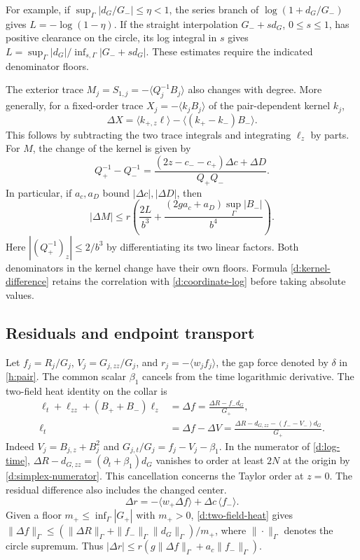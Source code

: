 For example, if \(\sup_\Gamma|d_G/G_-|\le\eta<1\), the series
branch of \(\log(1+d_G/G_-)\) gives \(L=-\log(1-\eta)\).
If the straight interpolation \(G_-+s d_G\), \(0\le s\le1\), has
positive clearance on the circle, its log integral in \(s\) gives
\(L=\sup_\Gamma |d_G|/\inf_{s,\Gamma}|G_-+s d_G|\).
These estimates require the indicated denominator floors.

The exterior trace \(M_j=S_{1,j}=-\langle Q_j^{-1}B_j\rangle\)
also changes with degree. More generally, for a fixed-order trace
\(X_j=-\langle k_j B_j\rangle\) of the pair-dependent kernel \(k_j\),
\begin{equation}
 \Delta X=\langle k_{+,z}\ell\rangle
           -\langle(k_+-k_-)B_-\rangle .
 \label{d:kernel-difference}
\end{equation}
This follows by subtracting the two trace integrals and integrating
\(\ell_z\) by parts. For \(M\), the change of the kernel is given by
\[
 Q_+^{-1}-Q_-^{-1}
   =\frac{(2z-c_--c_+)\Delta c+\Delta D}{Q_+Q_-}.
\]
In particular, if \(a_c,a_D\) bound \(|\Delta c|,|\Delta D|\),
then
\begin{equation}
 |\Delta M|\le
 r\left(\frac{2L}{b^3}
        +\frac{(2g a_c+a_D)\sup_\Gamma|B_-|}{b^4}\right).
 \label{d:delta-m-bound}
\end{equation}
Here \(|(Q_+^{-1})_z|\le 2/b^3\) by differentiating its two
linear factors. Both denominators in the kernel change have their
own floors. Formula \eqref{d:kernel-difference} retains the correlation
with \eqref{d:coordinate-log} before taking absolute values.

\subsection{Residuals and endpoint transport}

Let \(f_j=R_j/G_j\), \(V_j=G_{j,zz}/G_j\), and
\(r_j=-\langle w_jf_j\rangle\), the gap force denoted by \(\delta\)
in \eqref{h:pair}.
The common scalar \(\beta_1\) cancels from the time logarithmic
derivative. The two-field heat identity on the collar is
\begin{align}
 \ell_t+\ell_{zz}+(B_++B_-)\ell_z
  &=\Delta f
   =\frac{\Delta R-f_-d_G}{G_+},
 \label{d:two-field-heat}\\
 \ell_t&=\Delta f-\Delta V
   =\frac{\Delta R-d_{G,zz}-(f_--V_-)d_G}{G_+}.
 \label{d:log-time}
\end{align}
Indeed \(V_j=B_{j,z}+B_j^2\) and
\(G_{j,t}/G_j=f_j-V_j-\beta_1\). In the numerator of
\eqref{d:log-time},
\(\Delta R-d_{G,zz}=(\partial_t+\beta_1)d_G\) vanishes to
order at least \(2N\) at the origin by \eqref{d:simplex-numerator}.
This cancellation concerns the Taylor order at \(z=0\).
The residual difference also includes the changed center.
\begin{equation}
 \Delta r=-\langle w_+\Delta f\rangle+\Delta c\,\langle f_-\rangle.
 \label{d:residual-difference}
\end{equation}
Given a floor \(m_+\le\inf_\Gamma|G_+|\) with \(m_+>0\),
\eqref{d:two-field-heat} gives
\(\|\Delta f\|_\Gamma\le(\|\Delta R\|_\Gamma+
\|f_-\|_\Gamma\|d_G\|_\Gamma)/m_+\), where \(\|\cdot\|_\Gamma\)
denotes the circle supremum. Thus
\(|\Delta r|\le r(g\|\Delta f\|_\Gamma+a_c\|f_-\|_\Gamma)\).

